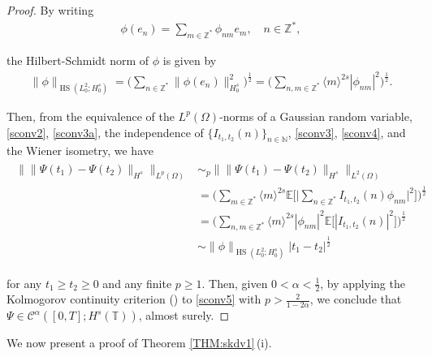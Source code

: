 \documentclass[letterpaper, 11pt,  reqno]{amsart}
\DeclareMathOperator{\HS}{HS}
\newcommand{\1}{\hspace{0.5mm}\text{I}\hspace{0.5mm}}
\newcommand{\noi}{\noindent}
\newcommand{\Z}{\mathbb{Z}}
\newcommand{\T}{\mathbb{T}}
\newcommand{\E}{\mathbb{E}}
\newcommand{\CC}{\mathcal{C}}
\newcommand{\al}{\alpha}
\renewcommand{\O}{\Omega}
\newcommand{\jb}[1]
{\langle #1 \rangle}
\newcommand{\N}{\mathbb{N}}
\numberwithin{equation}{section}
\numberwithin{theorem}{section}
\begin{document}
\begin{proof}

By writing 
\begin{align}
\phi(e_n) = \sum_{m \in \Z^*} \phi_{nm} e_m, \quad n \in \Z^*,
\label{sconv3a} 
\end{align}

\noi
the Hilbert-Schmidt norm of $\phi$ is given by 
\begin{align}
\| \phi\|_{\HS(L^2_0; H^s_0)}
= \bigg(\sum_{n \in \Z^*}\|\phi(e_n)\|_{H^s_0}^2\bigg)^\frac 12 
= \bigg(\sum_{n, m  \in \Z^*}\jb{m}^{2s} |\phi_{nm}|^2 \bigg)^\frac 12 .
\label{sconv4}
\end{align}

\noi
Then, from the equivalence of the $L^p(\O)$-norms 
of a Gaussian random variable, \eqref{sconv2}, 
\eqref{sconv3a}, 
the independence of 
$\{I_{t_1, t_2}(n)\}_{n \in \N}$, 
\eqref{sconv3}, 
\eqref{sconv4}, 
and the Wiener isometry, we have
\begin{align}
\begin{split}
\big\| \|\Psi(t_1) - \Psi(t_2)\|_{H^s}\big\|_{L^p(\O)}
& \sim_p  \big\| \|\Psi(t_1) - \Psi(t_2)\|_{H^s}\big\|_{L^2(\O)}\\
& = \bigg(\sum_{m \in \Z^*} \jb{m}^{2s}
\E\bigg[\Big|\sum_{n \in \Z^*} I_{t_1, t_2}(n)\phi_{nm}\Big|^2\bigg]\bigg)^\frac 12 \\
& =  \bigg(\sum_{n, m \in \Z^*} \jb{m}^{2s}|\phi_{nm}|^2
\E\big[|I_{t_1, t_2}(n)|^2\big]\bigg)^\frac 12 \\
& \sim \|\phi\|_{\HS(L^2_0; H^s_0)}|t_1 - t_2|^\frac 12 
\end{split}
\label{sconv5}
\end{align}


\noi
for any $t_1 \ge t_2 \ge 0$ and any finite $p \ge 1$.
Then, given $0 < \al < \frac 12$, 
by applying
the Kolmogorov continuity criterion (\cite[Theorem 2.1]{Baldi})
to \eqref{sconv5}
with  $p > \frac{2}{1-2\al}$, 
 we conclude that 
 $\Psi \in \CC^\al([0, T]; H^s(\T))$, 
 almost surely.
 \end{proof}



We now present 
a proof of Theorem \ref{THM:skdv1}\,(i).
\end{document}
